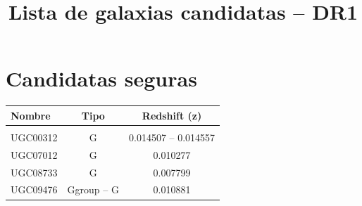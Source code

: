 \documentclass[9pt]{revtex4-1}
\title{Lista de galaxias candidatas -- DR1}
\begin{document}
\maketitle

\section{Candidatas seguras}


\begin{center}
\begin{tabular}{ l c c }
Nombre & Tipo & Redshift (z) \\
\hline
\hline \\
UGC00312 & G & 0.014507 -- 0.014557 \\
UGC07012 & G & 0.010277 \\
UGC08733 & G & 0.007799 \\
UGC09476 & Ggroup -- G & 0.010881 \\
\end{tabular}
\end{center}
\end{document}
